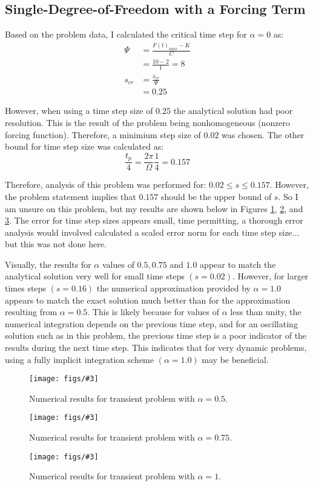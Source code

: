 \documentclass[letterpaper, 10pt, oneside]{article}
\newcommand{\be}{\begin{equation}}
\newcommand{\ee}{\end{equation}}
\newcommand{\as}[1]{\begin{align*}#1\end{align*}}
\newcommand{\Figure}[4]{
  \begin{figure}[#1]
    \centering
    \texttt{[image: figs/\#3]}
    \caption{#4.}\label{fig:#3}
  \end{figure}}
\begin{document}
\subsection{Single-Degree-of-Freedom with a Forcing Term}
Based on the problem data, I calculated the critical time step for $\alpha = 0$ as:
	\as{\Psi &= \frac{F(t)_{max}-K}{C} \\
		& = \frac{10-2}{1} = 8 \\
		s_{cr} &= \frac{\bar{s}_{cr}}{\Psi} \\
		& = 0.25}

However, when using a time step size of $0.25$ the analytical solution had poor resolution.  This is the result of the problem being nonhomogeneous (nonzero forcing function).  Therefore, a minimium step size of $0.02$ was chosen. The other bound for time step size was calculated as:
\be \frac{t_p}{4} = \frac{2 \pi}{\Omega} \frac{1}{4} = 0.157 \ee

Therefore, analysis of this problem was performed for: $0.02 \le s \le 0.157$. However, the problem statement implies that $0.157$ should be the upper bound of $s$. So I am unsure on this problem, but my results are shown below in Figures \ref{fig:3b_1.pdf}, \ref{fig:3b_2.pdf}, and \ref{fig:3b_3.pdf}. The error for time step sizes appears small, time permitting, a thorough error analysis would involved calculated a scaled error norm for each time step size... but this was not done here.

Visually, the results for $\alpha$ values of $0.5, 0.75$ and $1.0$ appear to match the analytical solution very well for small time steps $(s=0.02)$.  However, for larger times steps $(s=0.16)$ the numerical approximation provided by $\alpha = 1.0$ appears to match the exact solution much better than for the approximation resulting from $\alpha = 0.5$.  This is likely because for values of $\alpha$ less than unity, the numerical integration depends on the previous time step, and for an oscillating solution such as in this problem, the previous time step is a poor indicator of the results during the next time step.  This indicates that for very dynamic problems, using a fully implicit integration scheme $(\alpha = 1.0)$ may be beneficial.

\Figure{htp}{6}{3b_1.pdf}{Numerical results for transient problem with $\alpha = 0.5$}

\Figure{htp}{6}{3b_2.pdf}{Numerical results for transient problem with $\alpha = 0.75$}

\Figure{htp}{6}{3b_3.pdf}{Numerical results for transient problem with $\alpha = 1$}
\end{document}
